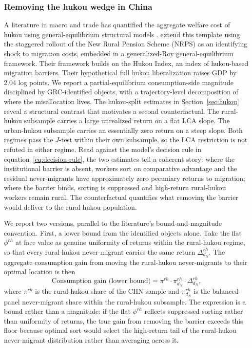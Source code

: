 \documentclass[12pt]{article}
\begin{document}
\subsubsection{Removing the hukou wedge in China}\label{sec:hukou-counterfactual}

A literature in macro and trade has quantified the aggregate welfare cost of hukou using general-equilibrium structural models \citep{tombeTradeMigrationProductivity2019,fanInternalGeographyLabor2019}.
\cite{gaiRuralPensionsLabor2025} extend this template using the staggered rollout of the New Rural Pension Scheme (NRPS) as an identifying shock to migration costs, embedded in a generalized-Roy general-equilibrium framework.
Their framework builds on the \citet{fanInternalGeographyLabor2019} Hukou Index, an index of hukou-based migration barriers.
Their hypothetical full hukou liberalization raises GDP by 2.04 log points.
We report a partial-equilibrium consumption-side magnitude disciplined by GRC-identified objects, with a trajectory-level decomposition of where the misallocation lives.
The hukou-split estimates in Section~\ref{sec:hukou} reveal a structural contrast that motivates a second counterfactual.
The rural-hukou subsample carries a large unrealized return on a flat LCA slope.
The urban-hukou subsample carries an essentially zero return on a steep slope.
Both regimes pass the $J$-test within their own subsample, so the LCA restriction is not refuted in either regime.
Read against the model's decision rule in equation~\eqref{eq:decision-rule}, the two estimates tell a coherent story: where the institutional barrier is absent, workers sort on comparative advantage and the residual never-migrants have approximately zero pecuniary returns to migration; where the barrier binds, sorting is suppressed and high-return rural-hukou workers remain rural.
The counterfactual quantifies what removing the barrier would deliver to the rural-hukou population.

We report two versions, parallel to the literature's bound-and-magnitude convention.
First, a lower bound from the identified objects alone.
Take the flat $\phi^{rh}$ at face value as genuine uniformity of returns within the rural-hukou regime, so that every rural-hukou never-migrant carries the same return $\Delta_{d_N}^{rh}$.
The aggregate consumption gain from moving the rural-hukou never-migrants to their optimal location is then
\begin{equation}\label{eq:hukou-bound}
    \text{Consumption gain (lower bound)} = \pi^{rh} \cdot \pi_{d_N}^{rh} \cdot \Delta_{d_N}^{rh},
\end{equation}
where $\pi^{rh}$ is the rural-hukou share of the CHN sample and $\pi_{d_N}^{rh}$ is the balanced-panel never-migrant share within the rural-hukou subsample.
The expression is a bound rather than a magnitude: if the flat $\phi^{rh}$ reflects suppressed sorting rather than uniformity of returns, the true gain from removing the barrier exceeds this floor because optimal sort would select the high-return tail of the rural-hukou never-migrant distribution rather than averaging across it.
\end{document}
